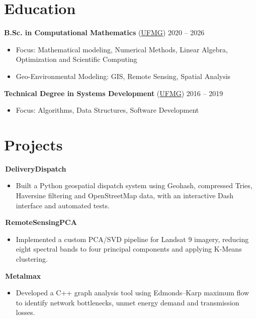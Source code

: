 \documentclass[10pt,a4paper]{article}
\begin{document}
\section*{Education}
\noindent\textbf{B.Sc. in Computational Mathematics} (\href{https://www.matcomp.dcc.ufmg.br/}{UFMG}) \hfill 2020 -- 2026
\begin{itemize}
    \item Focus: Mathematical modeling, Numerical Methods, Linear Algebra, Optimization and Scientific Computing
    \item Geo-Environmental Modeling: GIS, Remote Sensing, Spatial Analysis
\end{itemize}

\noindent\textbf{Technical Degree in Systems Development} (\href{https://www.coltec.ufmg.br/}{UFMG}) \hfill 2016 -- 2019
\begin{itemize}
    \item Focus: Algorithms, Data Structures, Software Development
\end{itemize}

\section*{Projects}

\noindent\href{https://github.com/ChrystianMelo/DeliveryDispatch}{\faGithub}\,\textbf{DeliveryDispatch}\par
\begin{itemize}
    \item Built a Python geospatial dispatch system using Geohash, compressed Tries, Haversine filtering and OpenStreetMap data, with an interactive Dash interface and automated tests.
\end{itemize}

\noindent\href{https://github.com/ChrystianMelo/RemoteSensingPCA}{\faGithub}\,\textbf{RemoteSensingPCA}\par
\begin{itemize}
    \item Implemented a custom PCA/SVD pipeline for Landsat 9 imagery, reducing eight spectral bands to four principal components and applying K-Means clustering.
\end{itemize}

\noindent\href{https://github.com/ChrystianMelo/Metalmax}{\faGithub}\,\textbf{Metalmax}\par
\begin{itemize}
    \item Developed a C++ graph analysis tool using Edmonds--Karp maximum flow to identify network bottlenecks, unmet energy demand and transmission losses.
\end{itemize}
\end{document}
